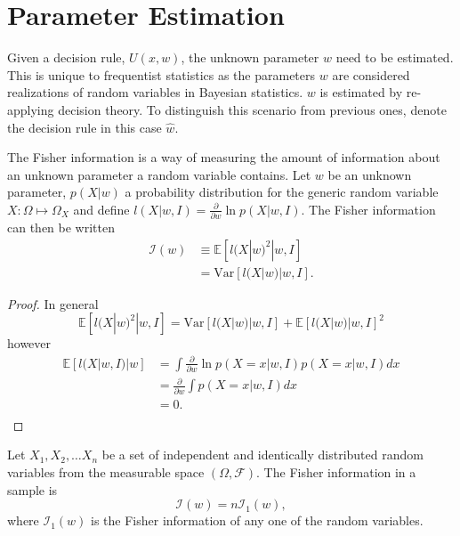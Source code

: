 \chapter{Parameter Estimation}
Given a decision rule, $U(x,w)$, the unknown parameter $w$ need to be estimated. This is unique to frequentist statistics as the parameters $w$ are considered realizations of random variables in Bayesian statistics. $w$ is estimated by re-applying decision theory. To distinguish this scenario from previous ones, denote the decision rule in this case $\hat{w}$.


\begin{definition}
	\label{def:fisher_information}
	The Fisher information is a way of measuring the amount of information about an unknown parameter a random variable contains. Let $w$ be an unknown parameter, $p(X|w)$ a probability distribution for the generic random variable $X:\Omega\mapsto \Omega_X$ and define $l(X|w,I)= \frac{\partial}{\partial w} \ln p(X|w,I)$. The Fisher information can then be written
	\begin{equation}
		\begin{split}
			\mathcal{I}(w) &\equiv \mathbb{E} [l(X|w)^2|w,I]\\
			&= \text{Var}[l(X|w)|w,I].
		\end{split}
	\end{equation}
\end{definition}

\begin{proof}
	In general 
	\begin{equation}
		\mathbb{E} [l(X|w)^2|w,I] = \text{Var}[l(X|w)|w,I]+\mathbb{E}[l(X|w)|w,I]^2
	\end{equation}
	however
	\begin{equation}
		\begin{split}
			\mathbb{E}[l(X|w,I)|w] &= \int  \frac{\partial}{\partial w} \ln p(X=x|w,I) p(X=x|w,I) dx\\
			&= \frac{\partial}{\partial w}\int  p(X=x|w,I) dx\\
			&= 0.\\
		\end{split}
	\end{equation}
\end{proof}


\begin{theorem}
	Let $X_1,X_2,\dots X_n$ be a set of independent and identically distributed random variables from the measurable space $(\Omega,\mathcal{F})$. The Fisher information in a sample is 
	\begin{equation}
		\mathcal{I}(w) = n\mathcal{I}_1(w),
	\end{equation}
	where $\mathcal{I}_1(w)$ is the Fisher information of any one of the random variables.
\end{theorem}


